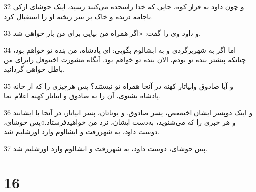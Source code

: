 \par 32 و چون داود به فراز کوه، جایی که خدا راسجده می‌کنند رسید، اینک حوشای ارکی باجامه دریده و خاک بر سر ریخته او را استقبال کرد.
\par 33 و داود وی را گفت: «اگر همراه من بیایی برای من بار خواهی شد.
\par 34 اما اگر به شهربرگردی و به ابشالوم بگویی: ای پادشاه، من بنده تو خواهم بود، چنانکه پیشتر بنده تو بودم، الان بنده تو خواهم بود. آنگاه مشورت اخیتوفل رابرای من باطل خواهی گردانید.
\par 35 و آیا صادوق وابیاتار کهنه در آنجا همراه تو نیستند؟ پس هرچیزی را که از خانه پادشاه بشنوی، آن را به صادوق و ابیاتار کهنه اعلام نما.
\par 36 و اینک دوپسر ایشان اخیمعص، پسر صادوق، و یوناتان، پسر ابیاتار، در آنجا با ایشانند و هر خبری را که می‌شنوید، به‌دست ایشان، نزد من خواهیدفرستاد.»پس حوشای، دوست داود، به شهررفت و ابشالوم وارد اورشلیم شد.
\par 37 پس حوشای، دوست داود، به شهررفت و ابشالوم وارد اورشلیم شد.
 
\chapter{16}

